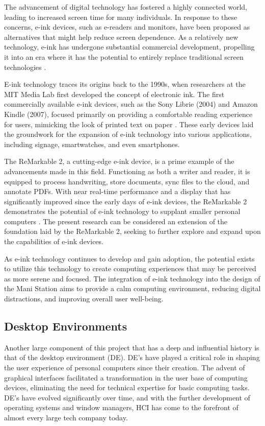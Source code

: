 \documentclass[letterpaper,twocolumn,10pt]{article}
\begin{document}
The advancement of digital technology has fostered a highly connected world, leading to increased screen time for many individuals. In response to these concerns, e-ink devices, such as e-readers and monitors, have been proposed as alternatives that might help reduce screen dependence. As a relatively new technology, e-ink has undergone substantial commercial development, propelling it into an era where it has the potential to entirely replace traditional screen technologies \cite{e-ink}.

E-ink technology traces its origins back to the 1990s, when researchers at the MIT Media Lab first developed the concept of electronic ink. The first commercially available e-ink devices, such as the Sony Librie (2004) and Amazon Kindle (2007), focused primarily on providing a comfortable reading experience for users, mimicking the look of printed text on paper \cite{e-ink-hist}. These early devices laid the groundwork for the expansion of e-ink technology into various applications, including signage, smartwatches, and even smartphones.

The ReMarkable 2, a cutting-edge e-ink device, is a prime example of the advancements made in this field. Functioning as both a writer and reader, it is equipped to process handwriting, store documents, sync files to the cloud, and annotate PDFs. With near real-time performance and a display that has significantly improved since the early days of e-ink devices, the ReMarkable 2 demonstrates the potential of e-ink technology to supplant smaller personal computers \cite{remarkable}. The present research can be considered an extension of the foundation laid by the ReMarkable 2, seeking to further explore and expand upon the capabilities of e-ink devices.

As e-ink technology continues to develop and gain adoption, the potential exists to utilize this technology to create computing experiences that may be perceived as more serene and focused. The integration of e-ink technology into the design of the Mani Station aims to provide a calm computing environment, reducing digital distractions, and improving overall user well-being.

\subsection{Desktop Environments}

Another large component of this project that has a deep and influential history is that of the desktop environment (DE). DE’s have played a critical role in shaping the user experience of personal computers since their creation. The advent of graphical interfaces facilitated a transformation in the user base of computing devices, eliminating the need for technical expertise for basic computing tasks. DE’s have evolved significantly over time, and with the further development of operating systems and window managers, HCI has come to the forefront of almost every large tech company today.
\end{document}
